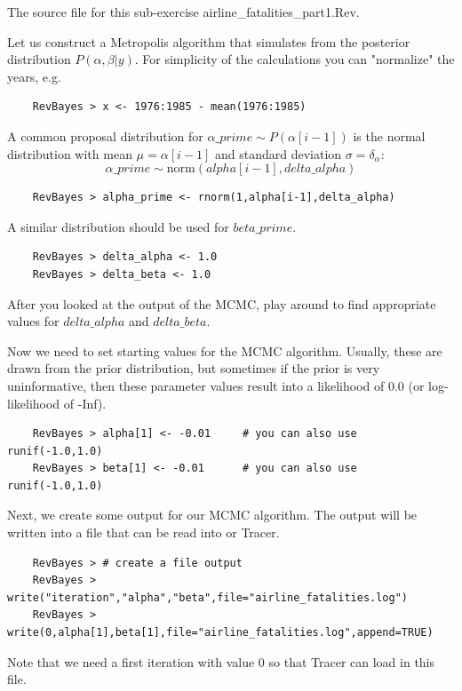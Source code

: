 \documentclass[11pt]{article}
\begin{document}
The source file for this sub-exercise airline\_fatalities\_part1.Rev.

Let us construct a Metropolis algorithm that simulates from the posterior distribution $P(\alpha,\beta|y)$. 
For simplicity of the calculations you can "normalize" the years, e.g. 
{\tt \begin{snugshade*}
\begin{lstlisting}    
    RevBayes > x <- 1976:1985 - mean(1976:1985)
\end{lstlisting}
\end{snugshade*}}

A common proposal distribution for $\alpha\_prime \sim P(\alpha[i-1])$ is the normal distribution with mean $\mu = \alpha[i-1]$ and standard deviation $\sigma = \delta_\alpha$:
\begin{equation}
\alpha\_prime \sim \text{norm}(alpha[i-1],delta\_alpha)
\end{equation}

{\tt \begin{snugshade*}
\begin{lstlisting}    
    RevBayes > alpha_prime <- rnorm(1,alpha[i-1],delta_alpha)
\end{lstlisting}
\end{snugshade*}}
A similar distribution should be used for $beta\_prime$. 
{\tt \begin{snugshade*}
\begin{lstlisting}    
    RevBayes > delta_alpha <- 1.0
    RevBayes > delta_beta <- 1.0
\end{lstlisting}
\end{snugshade*}}
After you looked at the output of the MCMC, play around to find appropriate values for $delta\_alpha$ and $delta\_beta$.

Now we need to set starting values for the MCMC algorithm.
Usually, these are drawn from the prior distribution, but sometimes if the prior is very uninformative, then these parameter values result into a likelihood of 0.0 (or log-likelihood of -Inf).
{\tt \begin{snugshade*}
\begin{lstlisting}    
    RevBayes > alpha[1] <- -0.01     # you can also use runif(-1.0,1.0)
    RevBayes > beta[1] <- -0.01      # you can also use runif(-1.0,1.0)
\end{lstlisting}
\end{snugshade*}}
Next, we create some output for our MCMC algorithm.
The output will be written into a file that can be read into \R or Tracer.
{\tt \begin{snugshade*}
\begin{lstlisting}    
    RevBayes > # create a file output
    RevBayes > write("iteration","alpha","beta",file="airline_fatalities.log")
    RevBayes > write(0,alpha[1],beta[1],file="airline_fatalities.log",append=TRUE)
\end{lstlisting}
\end{snugshade*}}
Note that we need a first iteration with value 0 so that Tracer can load in this file.
\end{document}
